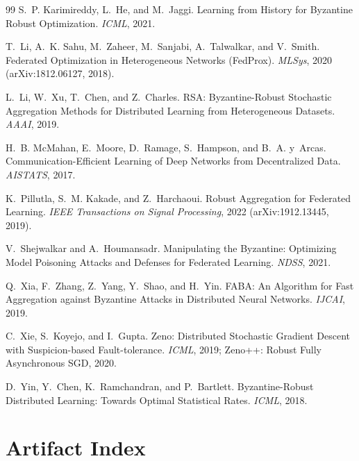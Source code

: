 \documentclass[11pt,a4paper]{article}
\begin{document}
\begin{thebibliography}{99}
S.~P. Karimireddy, L.~He, and M.~Jaggi.
\newblock Learning from History for Byzantine Robust Optimization.
\newblock \emph{ICML}, 2021.

T.~Li, A.~K. Sahu, M.~Zaheer, M.~Sanjabi, A.~Talwalkar, and V.~Smith.
\newblock Federated Optimization in Heterogeneous Networks (FedProx).
\newblock \emph{MLSys}, 2020 (arXiv:1812.06127, 2018).

L.~Li, W.~Xu, T.~Chen, and Z.~Charles.
\newblock RSA: Byzantine-Robust Stochastic Aggregation Methods for Distributed
  Learning from Heterogeneous Datasets.
\newblock \emph{AAAI}, 2019.

H.~B. McMahan, E.~Moore, D.~Ramage, S.~Hampson, and B.~A. y~Arcas.
\newblock Communication-Efficient Learning of Deep Networks from Decentralized
  Data.
\newblock \emph{AISTATS}, 2017.

K.~Pillutla, S.~M. Kakade, and Z.~Harchaoui.
\newblock Robust Aggregation for Federated Learning.
\newblock \emph{IEEE Transactions on Signal Processing}, 2022
  (arXiv:1912.13445, 2019).

V.~Shejwalkar and A.~Houmansadr.
\newblock Manipulating the Byzantine: Optimizing Model Poisoning Attacks and
  Defenses for Federated Learning.
\newblock \emph{NDSS}, 2021.

Q.~Xia, F.~Zhang, Z.~Yang, Y.~Shao, and H.~Yin.
\newblock FABA: An Algorithm for Fast Aggregation against Byzantine Attacks in
  Distributed Neural Networks.
\newblock \emph{IJCAI}, 2019.

C.~Xie, S.~Koyejo, and I.~Gupta.
\newblock Zeno: Distributed Stochastic Gradient Descent with Suspicion-based
  Fault-tolerance.
\newblock \emph{ICML}, 2019; Zeno++: Robust Fully Asynchronous SGD, 2020.

D.~Yin, Y.~Chen, K.~Ramchandran, and P.~Bartlett.
\newblock Byzantine-Robust Distributed Learning: Towards Optimal Statistical
  Rates.
\newblock \emph{ICML}, 2018.

\end{thebibliography}

\appendix

\section{Artifact Index}
\label{app:artifacts}
\end{document}
